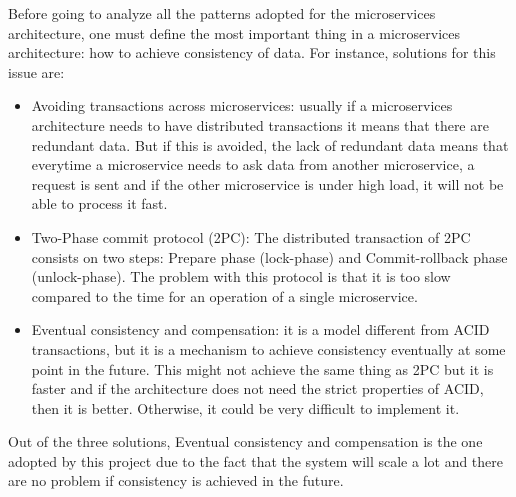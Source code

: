 \par

Before going to analyze all the patterns adopted for the microservices architecture, one must define the most important thing in a microservices architecture: how to achieve consistency of data. For instance, solutions for this issue are:
\begin{itemize}
\item Avoiding transactions across microservices: usually if a microservices architecture needs to have distributed transactions 
it means that there are redundant data. But if this is avoided, the lack of redundant data means that everytime a microservice needs 
to ask data from another microservice, a request is sent and if the other microservice is under high load, it will not be able to 
process it fast.
\item Two-Phase commit protocol (2PC): The distributed transaction of 2PC consists on two steps: Prepare phase (lock-phase) 
and Commit-rollback phase (unlock-phase). The problem with this protocol is that it is too slow compared to the time for an 
operation of a single microservice.
\item Eventual consistency and compensation: it is a model different from ACID transactions, but it is a mechanism to 
achieve consistency eventually at some point in the future. This might not achieve the same thing as 2PC but it is faster and if 
the architecture does not need the strict properties of ACID, then it is better. Otherwise, it could be very difficult to implement it.
\end{itemize}
Out of the three solutions, Eventual consistency and compensation is the one adopted by this project due to the fact that the system will scale a lot and there are no problem if consistency is achieved in the future.

\par

